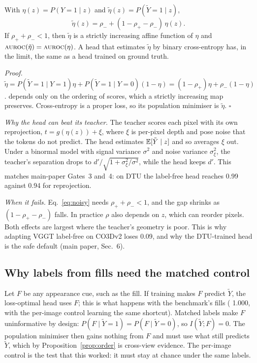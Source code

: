 \begin{proposition}\label{prop:noise}
With $\eta(z)=P(Y\!=\!1\mid z)$ and $\tilde\eta(z)=P(\tilde Y\!=\!1\mid z)$,
\begin{equation}
  \tilde\eta(z)=\rho_{-}+(1-\rho_{+}-\rho_{-})\,\eta(z).
  \label{eq:noisy}
\end{equation}
If $\rho_{+}+\rho_{-}<1$, then $\tilde\eta$ is a strictly increasing affine
function of $\eta$ and $\textsc{auroc}(\tilde\eta)=\textsc{auroc}(\eta)$. A head that estimates
$\tilde\eta$ by binary cross-entropy has, in the limit, the same \auroc{} as a
head trained on ground truth.
\end{proposition}
\par\noindent\emph{Proof.}~
$\tilde\eta=P(\tilde Y\!=\!1\mid Y\!=\!1)\eta+P(\tilde Y\!=\!1\mid Y\!=\!0)(1-\eta)
=(1-\rho_{+})\eta+\rho_{-}(1-\eta)$. \auroc{} depends only on the ordering of
scores, which a strictly increasing map preserves. Cross-entropy is a proper
loss, so its population minimiser is $\tilde\eta$.
\hfill$\square$\par

\noindent\emph{Why the head can beat its teacher.} The teacher scores each
pixel with its own reprojection, $t=g(\eta(z))+\xi$, where $\xi$ is
per-pixel depth and pose noise that the tokens do not predict. The head
estimates $\mathbb{E}[\tilde Y\mid z]$ and so averages $\xi$ out. Under a binormal
model with signal variance $\sigma^2$ and noise variance $\sigma_\xi^2$, the
teacher's separation drops to $d'/\sqrt{1+\sigma_\xi^2/\sigma^2}$, while the
head keeps $d'$. This matches main-paper Gates~3 and~4: on DTU the label-free
head reaches 0.99 against 0.94 for reprojection.

\noindent\emph{When it fails.} Eq.~\eqref{eq:noisy} needs
$\rho_{+}+\rho_{-}<1$, and the gap shrinks as $(1-\rho_{+}-\rho_{-})$ falls.
In practice $\rho$ also depends on $z$, which can reorder pixels. Both effects
are largest where the teacher's geometry is poor. This is why adapting
VGGT label-free on CO3Dv2 loses 0.09, and why the DTU-trained head is the safe
default (main paper, Sec.~6).

\subsection{Why labels from fills need the matched control}

Let $F$ be any appearance cue, such as the fill. If training makes $F$ predict
$\tilde Y$, the loss-optimal head uses $F$; this is what happens with the
benchmark's fills (\auroc{} 1.000, with the per-image control learning the
same shortcut). Matched labels make $F$ uninformative by design:
$P(F\mid\tilde Y\!=\!1)=P(F\mid\tilde Y\!=\!0)$, so $I(\tilde Y;F)=0$. The
population minimiser then gains nothing from $F$ and must use what still
predicts $\tilde Y$, which by Proposition~\ref{prop:order} is cross-view
evidence. The per-image control is the test that this worked: it must stay at
chance under the same labels.


